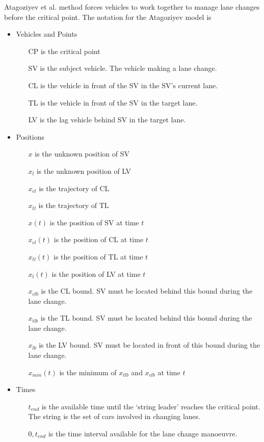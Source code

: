 Atagoziyev et al. method forces vehicles to work together to manage lane changes before the critical point. The notation for the Atagoziyev model is

\begin{itemize}
\item Vehicles and Points
\begin{itemize}
\item[CP] is the critical point
\item[SV] is the subject vehicle. The vehicle making a lane change.
\item[CL] is the vehicle in front of the SV in the SV's current lane.
\item[TL] is the vehicle in front of the SV in the target lane.
\item[LV] is the lag vehicle behind SV in the target lane.
\end{itemize}
\item Positions
\begin{itemize}
\item[$x$] is the unknown position of SV
\item[$x_l$] is the unknown position of LV
\item[$x_{cl}$] is the trajectory of CL
\item[$x_{tl}$] is the trajectory of TL
\item[$x(t)$] is the position of SV at time $t$
\item[$x_{cl}(t)$] is the position of CL at time $t$
\item[$x_{tl}(t)$] is the position of TL at time $t$
\item[$x_l(t)$] is the position of LV at time $t$
\item[$x_{clb}$] is the CL bound. SV must be located behind this bound during the lane change.
\item[$x_{tlb}$] is the TL bound. SV must be located behind this bound during the lane change.
\item[$x_{lb}$] is the LV bound. SV must be located in front of this bound during the lane change.
\item[$x_{min}(t)$] is the minimum of $x_{tlb}$ and $x_{clb}$ at time $t$
\end{itemize}
\item Times
\begin{itemize}
\item[$t_{end}$] is the available time until the `string leader' reaches the critical point. The string is the set of cars involved in changing lanes.
\item[$0,t_{end}$] is the time interval available for the lane change manoeuvre.

\end{itemize}
\end{itemize}
